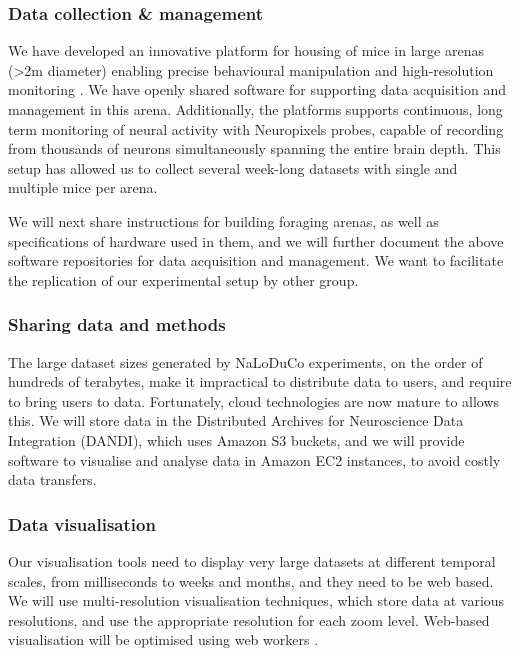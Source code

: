 \subsubsection{Data collection \& management}

We have developed an innovative platform for housing of mice in large arenas
(\textgreater 2m diameter) enabling precise behavioural manipulation and
high-resolution monitoring \citep[Figure~\ref{fig:arena}, ][]{campagnerEtAl24}.
%
We have openly shared software for supporting data acquisition
\citep{aeonacquisition} and management \citep{aeonmecha} in this
arena.
%
Additionally, the platforms supports continuous, long term monitoring of neural
activity with Neuropixels probes, capable of recording from thousands of
neurons simultaneously spanning the entire brain depth.
%
This setup has allowed us to collect several week-long datasets with single and
multiple mice per arena.

We will next share instructions for building foraging arenas, as well as
specifications of hardware used in them,
%
and we will further document the above software repositories for data acquisition
and management.
%
We want to facilitate the replication of our experimental setup by other group.



\subsubsection{Sharing data and methods}

The large dataset sizes generated by NaLoDuCo experiments, on the order of
hundreds of terabytes,  make it impractical to distribute data to users, and
require to bring users to data. Fortunately, cloud technologies are now mature
to allows this.
%
We will store data in the Distributed Archives for Neuroscience Data
Integration (DANDI), which uses Amazon S3 buckets, and we will provide software
to visualise and analyse data in Amazon EC2 instances, to avoid costly data
transfers.

\subsubsection{Data visualisation}

Our visualisation tools
need to display very large datasets at different temporal scales, from
milliseconds to weeks and months, and they need to be web based.
%
We will use multi-resolution visualisation techniques, which store data at
various resolutions, and use the appropriate resolution for each zoom level.
%
Web-based visualisation will be optimised using web workers
\citep{web Workers}.


